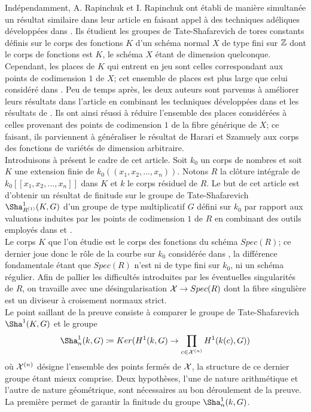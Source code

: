 \documentclass[11pt]{article}
\begin{document}
Indépendamment, A. Rapinchuk et I. Rapinchuk ont établi de manière simultanée un résultat similaire dans leur article \cite{Rapinchuk1} en faisant appel à des techniques adéliques développées dans \cite{Rapinchuk3}. Ils étudient les groupes de Tate-Shafarevich de tores constants définis sur le corps des fonctions $K$ d'un schéma normal $X$ de type fini sur $\mathbb{Z}$ dont le corps de fonctions est $K$, le schéma $X$ étant de dimension quelconque. Cependant, les places de $K$ qui entrent en jeu sont celles correspondant aux points de codimension $1$ de $X$; cet ensemble de places est plus large que celui considéré dans \cite{HarSza}.
Peu de temps après, les deux auteurs sont parvenus à améliorer leurs résultats dans l'article \cite{Rapinchuk2} en combinant les techniques développées dans \cite{Rapinchuk1} et les résultats de \cite{HarSza}. Ils ont ainsi réussi à réduire l'ensemble des places considérées à celles provenant des points de codimension $1$ de la fibre générique de $X$; ce faisant, ils parviennent à généraliser le résultat de Harari et Szamuely aux corps des fonctions de variétés de dimension arbitraire.\\

Introduisons à présent le cadre de cet article. Soit $k_0$ un corps de nombres et soit $K$ une extension finie de $k_0(\!(x_1,x_2,...,x_n)\!)$. Notons $R$ la clôture intégrale de $k_0[[x_1,x_2,...,x_n]]$ dans $K$ et $k$ le corps résiduel de $R$. Le but de cet article est d'obtenir un résultat de finitude sur le groupe de Tate-Shafarevich $\Sha^1_{R^{(1)}}(K,G)$ d'un groupe de type multiplicatif $G$ défini sur $k_0$ par rapport aux valuations induites par les points de codimension $1$ de $R$ en combinant des outils employés dans \cite{HarSza} et \cite{CTOP}.\\

Le corps $K$ que l'on étudie est le corps des fonctions du schéma $Spec(R)$; ce dernier joue donc le rôle de la courbe sur $k_0$ considérée dans \cite{HarSza}, la différence fondamentale étant que  $Spec(R)$ n'est ni de type fini sur $k_0$, ni un schéma régulier. Afin de pallier les difficultés introduites par les éventuelles singularités de $R$, on travaille avec une désingularisation $\mathcal{X} \rightarrow Spec(R)$ dont la fibre singulière est un diviseur à croisement normaux strict.\\

Le point saillant de la preuve consiste à comparer le groupe de Tate-Shafarevich $\Sha^1(K,G)$ et le groupe
$$
\Sha_{n}^1(k,G) \coloneqq Ker(H^1(k,G) \ra \prod_{c \in \CX^{(n)}}H^1(k(c),G))
$$
où $\mathcal{X}^{(n)}$ désigne l'ensemble des points fermés de $\mathcal{X}$, la structure de ce dernier groupe étant mieux comprise.
Deux hypothèses, l'une de nature arithmétique et l'autre de nature géométrique, sont nécessaires au bon déroulement de la preuve. La première permet de garantir la finitude du groupe $\Sha_{n}^1(k,G)$.
\end{document}
